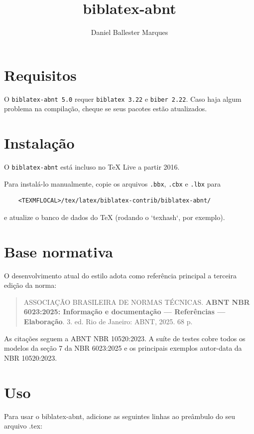 \documentclass[a4paper]{article}
\title{biblatex-abnt \version}
\author{Daniel Ballester Marques}
\newcommand{\version}{5.0}
\newcommand{\requirements}{\texttt{biblatex 3.22} e \texttt{biber 2.22}}
\begin{document}

\maketitle

\tableofcontents

\clearpage
\section{Requisitos}%

O \texttt{biblatex-abnt \version} requer \requirements. Caso haja algum
problema na compilação, cheque se seus pacotes estão atualizados.

\section{Instalação}%

O \texttt{biblatex-abnt} está incluso no TeX Live a partir 2016.

Para instalá-lo manualmente, copie os arquivos \texttt{.bbx}, \texttt{.cbx} e
\texttt{.lbx} para
\begin{verbatim}
    <TEXMFLOCAL>/tex/latex/biblatex-contrib/biblatex-abnt/
\end{verbatim}
e atualize o banco de dados do TeX (rodando o `texhash`, por exemplo).

\section{Base normativa}%

O desenvolvimento atual do estilo adota como referência principal a terceira
edição da norma:

\begin{quote}
  ASSOCIAÇÃO BRASILEIRA DE NORMAS TÉCNICAS. \textbf{ABNT NBR 6023:2025:
  Informação e documentação --- Referências --- Elaboração}. 3. ed.
  Rio de Janeiro: ABNT, 2025. 68 p.
\end{quote}

As citações seguem a ABNT NBR 10520:2023. A suíte de testes cobre todos os
modelos da seção 7 da NBR 6023:2025 e os principais exemplos autor-data da
NBR 10520:2023.

\section{Uso}%

Para usar o {biblatex-abnt}, adicione as seguintes linhas ao preâmbulo do seu
arquivo {.tex}:
\end{document}
